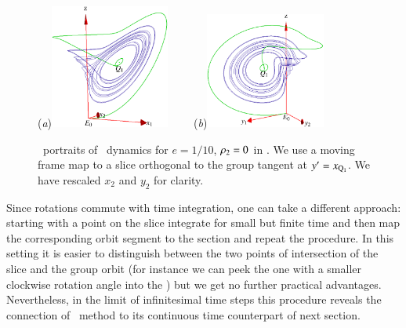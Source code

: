 \begin{figure}[ht]
\begin{center}
  (\textit{a})\includegraphics[width=0.35\textwidth,clip=true]{../figs/CLEmfReqb1}
~~~~(\textit{b})\includegraphics[width=0.35\textwidth,clip=true]{../figs/CLEmfReqb}
\end{center}
\caption{ \Statesp\
portraits of \cLe\ dynamics for $e=1/10$, $\rho_2=0$
in \reducedsp. We use a moving frame map to a slice orthogonal
to the group tangent at  ${y'}  = x_{\mathrm{Q}_{1}}$. We have rescaled $x_2$ and $y_2$ 
for clarity.
    }
\label{fig:CLEmfReqb1}
\end{figure}

Since rotations commute with time integration, one can take a different approach: 
starting with a point on the slice integrate for small but finite time and then map the 
corresponding orbit segment to the section and repeat the procedure. In this setting it
is easier to distinguish between the two points of intersection of the slice and the group
orbit (for instance we can peek the one with a smaller clockwise rotation angle into the \slice)
but we get no further practical advantages. Nevertheless, in the limit of infinitesimal
time steps this procedure reveals the connection of \mframes\ method to 
its continuous time counterpart of next section. 

  
